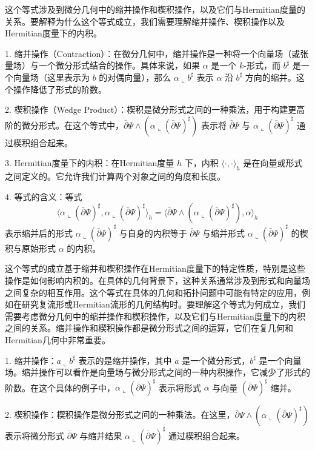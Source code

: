 \begin{remark}
  这个等式涉及到微分几何中的缩并操作和楔积操作，以及它们与Hermitian度量的关系。要解释为什么这个等式成立，我们需要理解缩并操作、楔积操作以及Hermitian度量下的内积。

1. 缩并操作（Contraction）：在微分几何中，缩并操作是一种将一个向量场（或张量场）与一个微分形式结合的操作。具体来说，如果 \( \alpha \) 是一个 \( k \)-形式，而 \( b^\sharp \) 是一个向量场（这里表示为 \( b \) 的对偶向量），那么 \( \alpha \llcorner b^\sharp \) 表示 \( \alpha \) 沿 \( b^\sharp \) 方向的缩并。这个操作降低了形式的阶数。

2. 楔积操作（Wedge Product）：楔积是微分形式之间的一种乘法，用于构建更高阶的微分形式。在这个等式中，\( \bar\partial\Psi \wedge (\alpha\llcorner(\bar\partial\Psi)^\sharp) \) 表示将 \( \bar\partial\Psi \) 与 \( \alpha \llcorner (\bar\partial\Psi)^\sharp \) 通过楔积组合起来。

3. Hermitian度量下的内积：在Hermitian度量 \( h \) 下，内积 \( \langle \cdot, \cdot \rangle_h \) 是在向量或形式之间定义的。它允许我们计算两个对象之间的角度和长度。

4. 等式的含义：等式
   \[ \langle \alpha \llcorner (\bar\partial\Psi)^\sharp, \alpha \llcorner (\bar\partial\Psi)^\sharp \rangle_h = \langle \bar\partial\Psi \wedge (\alpha \llcorner (\bar\partial\Psi)^\sharp), \alpha \rangle_h \]
   表示缩并后的形式 \( \alpha \llcorner (\bar\partial\Psi)^\sharp \) 与自身的内积等于 \( \bar\partial\Psi \) 与缩并形式 \( \alpha \llcorner (\bar\partial\Psi)^\sharp \) 的楔积与原始形式 \( \alpha \) 的内积。

这个等式的成立基于缩并和楔积操作在Hermitian度量下的特定性质，特别是这些操作是如何影响内积的。在具体的几何背景下，这种关系通常涉及到形式和向量场之间复杂的相互作用。这个等式在具体的几何和拓扑问题中可能有特定的应用，例如在研究复流形或Hermitian流形的几何结构时。要理解这个等式为何成立，我们需要考虑微分几何中的缩并操作和楔积操作，以及它们与Hermitian度量下的内积之间的关系。缩并操作和楔积操作都是微分形式之间的运算，它们在复几何和Hermitian几何中非常重要。

1. 缩并操作：\( a \llcorner b^\sharp \) 表示的是缩并操作，其中 \( a \) 是一个微分形式，\( b^\sharp \) 是一个向量场。缩并操作可以看作是向量场与微分形式之间的一种内积操作，它减少了形式的阶数。在这个具体的例子中，\( \alpha \llcorner (\bar\partial\Psi)^\sharp \) 表示将形式 \( \alpha \) 与向量 \( (\bar\partial\Psi)^\sharp \) 缩并。

2. 楔积操作：楔积操作是微分形式之间的一种乘法。在这里，\( \bar\partial\Psi \wedge (\alpha \llcorner (\bar\partial\Psi)^\sharp) \) 表示将微分形式 \( \bar\partial\Psi \) 与缩并结果 \( \alpha \llcorner (\bar\partial\Psi)^\sharp \) 通过楔积组合起来。


\end{remark}
